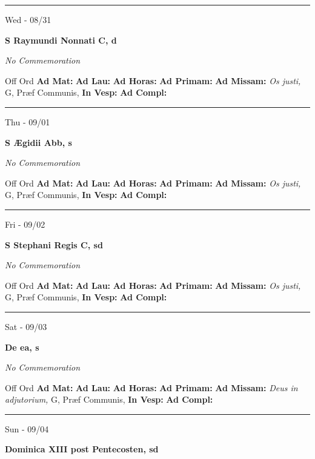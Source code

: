 \documentclass[letterpaper, 10pt]{article}
\begin{document}
\hrule
\begin{center}
Wed - 08/31
\end{center}\textbf{ \large S Raymundi Nonnati C, \textnormal{\normalsize d}}

\textit{No Commemoration}\begin{justify}
Off Ord
\textbf{Ad Mat: }
\textbf{Ad Lau: }
\textbf{Ad Horas: }
\textbf{Ad Primam: }
\textbf{Ad Missam:} \textit{Os justi, } G, Præf Communis, 
\textbf{In Vesp: }
\textbf{Ad Compl: }\end{justify}



\hrule
\begin{center}
Thu - 09/01
\end{center}\textbf{ \large S Ægidii Abb, \textnormal{\normalsize s}}

\textit{No Commemoration}\begin{justify}
Off Ord
\textbf{Ad Mat: }
\textbf{Ad Lau: }
\textbf{Ad Horas: }
\textbf{Ad Primam: }
\textbf{Ad Missam:} \textit{Os justi, } G, Præf Communis, 
\textbf{In Vesp: }
\textbf{Ad Compl: }\end{justify}



\hrule
\begin{center}
Fri - 09/02
\end{center}\textbf{ \large S Stephani Regis C, \textnormal{\normalsize sd}}

\textit{No Commemoration}\begin{justify}
Off Ord
\textbf{Ad Mat: }
\textbf{Ad Lau: }
\textbf{Ad Horas: }
\textbf{Ad Primam: }
\textbf{Ad Missam:} \textit{Os justi, } G, Præf Communis, 
\textbf{In Vesp: }
\textbf{Ad Compl: }\end{justify}



\hrule
\begin{center}
Sat - 09/03
\end{center}\textbf{ \large De ea, \textnormal{\normalsize s}}

\textit{No Commemoration}\begin{justify}
Off Ord
\textbf{Ad Mat: }
\textbf{Ad Lau: }
\textbf{Ad Horas: }
\textbf{Ad Primam: }
\textbf{Ad Missam:} \textit{Deus in adjutorium, } G, Præf Communis, 
\textbf{In Vesp: }
\textbf{Ad Compl: }\end{justify}



\hrule
\begin{center}
Sun - 09/04
\end{center}\textbf{ \large Dominica XIII post Pentecosten, \textnormal{\normalsize sd}}
\end{document}
